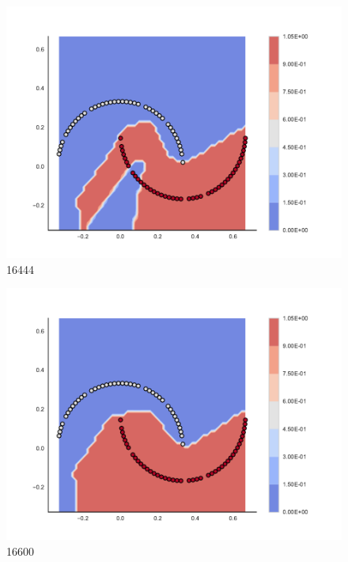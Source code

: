 \begin{subfigure}[b]{0.12\textwidth}
    \includegraphics[clip, trim=2.35cm 1.75cm 4.5cm 0cm,width=\textwidth]{img/convergence/16444.pdf}
    \caption{16444}
    \label{fig:convergence_16444}
\end{subfigure}
%
\begin{subfigure}[b]{0.12\textwidth}
    \includegraphics[clip, trim=2.35cm 1.75cm 4.5cm 0cm,width=\textwidth]{img/convergence/16600.pdf}
    \caption{16600}
    \label{fig:convergence_16600}
\end{subfigure}
%

